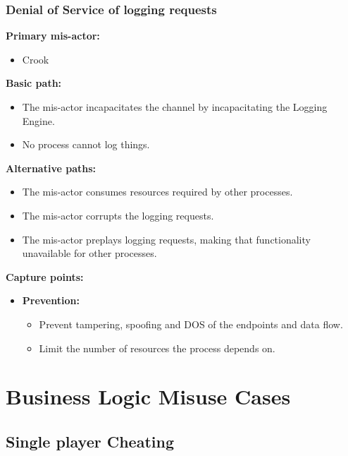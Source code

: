 \documentclass[a4paper,11pt]{report}
\begin{document}
\subsubsection{Denial of Service of logging requests}
\textbf{Primary mis-actor:}
\begin{itemize}
\item Crook
\end{itemize}
\textbf{Basic path:}
\begin{itemize}
\item The mis-actor incapacitates the channel by incapacitating the Logging Engine.
\item No process cannot log things.
\end{itemize}
\textbf{Alternative paths:}
\begin{itemize}
\item The mis-actor consumes resources required by other processes.
\item The mis-actor corrupts the logging requests.
\item The mis-actor preplays logging requests, making that functionality unavailable for other processes.
\end{itemize}
\textbf{Capture points:}
\begin{itemize}
\item \textbf{Prevention:}
\begin{itemize}
\item Prevent tampering, spoofing and DOS of the endpoints and data flow.
\item Limit the number of resources the process depends on.
\end{itemize}
\end{itemize}
\section{Business Logic Misuse Cases}
\subsection{Single player Cheating}
\end{document}
